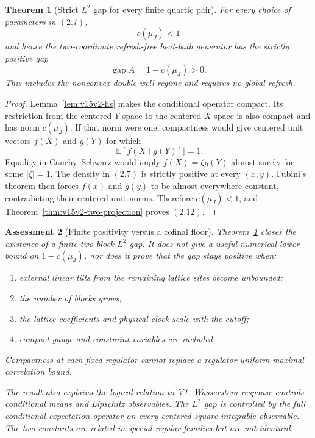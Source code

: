 \documentclass[11pt]{article}
\newtheorem{theorem}{Theorem}[section]
\newtheorem{assessment}[theorem]{Assessment}
\theoremstyle{remark}
\begin{document}
\begin{theorem}[Strict \(L^2\) gap for every finite quartic pair]
\label{thm:v15v2-quartic-pair}
For every choice of parameters in \((2.7)\),
\[
 c(\mu_J)<1
\]
and hence the two-coordinate refresh-free heat-bath generator has
the strictly positive gap
\[
 \boxed{\operatorname{gap}A=1-c(\mu_J)>0.}                   \tag{2.12}
\]
This includes the nonconvex double-well regime and requires no
global refresh.
\end{theorem}

\begin{proof}
Lemma~\ref{lem:v15v2-hs} makes the conditional operator compact.
Its restriction from the centered \(Y\)-space to the centered
\(X\)-space is also compact and has norm \(c(\mu_J)\).
If that norm were one, compactness would give centered unit
vectors \(f(X)\) and \(g(Y)\) for which
\[
 |\mathbb E[f(X)g(Y)]|=1.
\]
Equality in Cauchy--Schwarz would imply
\(f(X)=\zeta g(Y)\) almost surely for some \(|\zeta|=1\).
The density in \((2.7)\) is strictly positive at every
\((x,y)\).  Fubini's theorem then forces \(f(x)\) and \(g(y)\) to
be almost-everywhere constant, contradicting their centered unit
norms.  Therefore \(c(\mu_J)<1\), and
Theorem~\ref{thm:v15v2-two-projection} proves \((2.12)\).
\end{proof}

\begin{assessment}[Finite positivity versus a cofinal floor]
\label{ass:v15v2-uniformity}
Theorem~\ref{thm:v15v2-quartic-pair} closes the existence of a
finite two-block \(L^2\) gap.  It does not give a useful numerical
lower bound on \(1-c(\mu_J)\), nor does it prove that the gap stays
positive when:
\begin{enumerate}
\item external linear tilts from the remaining lattice sites become
      unbounded;
\item the number of blocks grows;
\item the lattice coefficients and physical clock scale with the
      cutoff;
\item compact gauge and constraint variables are included.
\end{enumerate}
Compactness at each fixed regulator cannot replace a
regulator-uniform maximal-correlation bound.

The result also explains the logical relation to V1.  Wasserstein
response controls conditional means and Lipschitz observables.
The \(L^2\) gap is controlled by the full conditional expectation
operator on every centered square-integrable observable.  The two
constants are related in special regular families but are not
identical.
\end{assessment}
\end{document}
